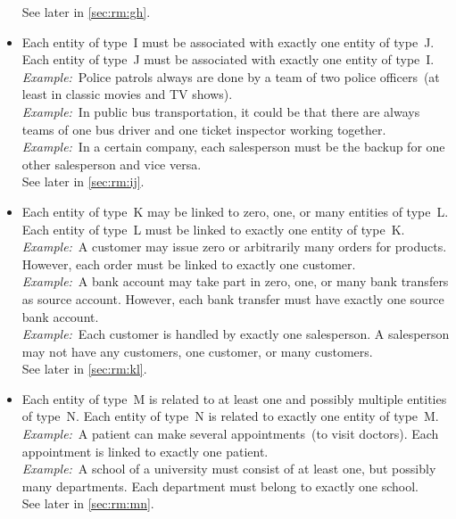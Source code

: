 \begin{itemize}
See later in \cref{sec:rm:gh}.%
%
\item {}
Each entity of type~I must be associated with exactly one entity of type~J.
Each entity of type~J must be associated with exactly one entity of type~I.\\%
\emph{Example:}~Police patrols always are done by a team of two police officers~(at least in classic movies and TV shows).\\%
\emph{Example:}~In public bus transportation, it could be that there are always teams of one bus driver and one ticket inspector working together.\\%
\emph{Example:}~In a certain company, each salesperson must be the backup for one other salesperson and vice versa.~\cite{T2025CDBMS:ERM}\\%
See later in \cref{sec:rm:ij}.%
%
\item {}
Each entity of type~K may be linked to zero, one, or many entities of type~L.
Each entity of type~L must be linked to exactly one entity of type~K.~\cite{MA2006MAC:DMERDED,BS2023G:CFNIERD}\\%
\emph{Example:}~A customer may issue zero or arbitrarily many orders for products.
However, each order must be linked to exactly one customer.~\cite{BS2023G:CFNIERD}\\%
\emph{Example:}~A bank account may take part in zero, one, or many bank transfers as source account.
However, each bank transfer must have exactly one source bank account.~\cite{MA2006MAC:DMERDED}\\%
\emph{Example:}~Each customer is handled by exactly one salesperson.
A salesperson may not have any customers, one customer, or many customers.~\cite{T2025CDBMS:ERM}\\%
See later in \cref{sec:rm:kl}.%
%
\item {}
Each entity of type~M is related to at least one and possibly multiple entities of type~N.
Each entity of type~N is related to exactly one entity of type~M.~\cite{BS2023G:EDFAHMSCFN}\\%
\emph{Example:}~A patient can make several appointments~(to visit doctors).
Each appointment is linked to exactly one patient.~\cite{BS2023G:EDFAHMSCFN}\\%
\emph{Example:}~A school of a university must consist of at least one, but possibly many departments.
Each department must belong to exactly one school.~\cite{R2024CDS:E}\\%
See later in \cref{sec:rm:mn}.%

\end{itemize}

